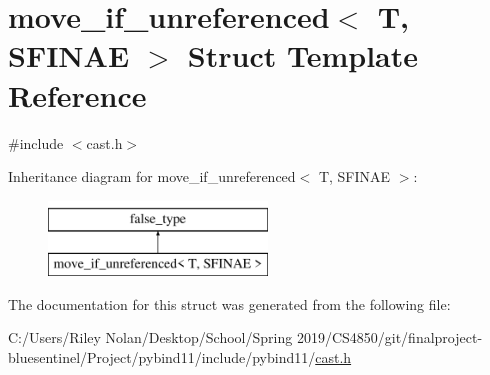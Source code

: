 \hypertarget{structmove__if__unreferenced}{}\section{move\+\_\+if\+\_\+unreferenced$<$ T, S\+F\+I\+N\+AE $>$ Struct Template Reference}
\label{structmove__if__unreferenced}


{\ttfamily \#include $<$cast.\+h$>$}

Inheritance diagram for move\+\_\+if\+\_\+unreferenced$<$ T, S\+F\+I\+N\+AE $>$\+:\begin{figure}[H]
\begin{center}
\leavevmode
\includegraphics[height=2.000000cm]{structmove__if__unreferenced}
\end{center}
\end{figure}


The documentation for this struct was generated from the following file\+:\begin{DoxyCompactItemize}
\item 
C\+:/\+Users/\+Riley Nolan/\+Desktop/\+School/\+Spring 2019/\+C\+S4850/git/finalproject-\/bluesentinel/\+Project/pybind11/include/pybind11/\mbox{\hyperlink{cast_8h}{cast.\+h}}\end{DoxyCompactItemize}
